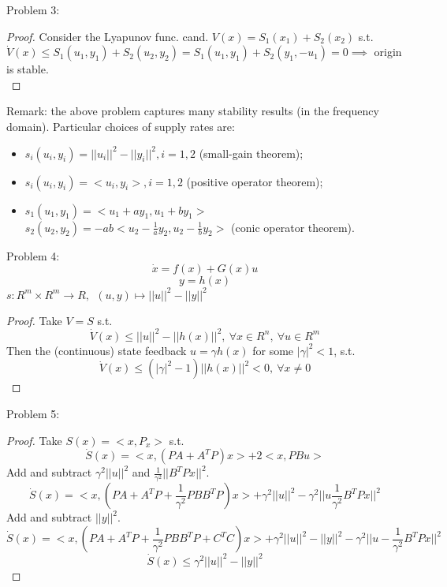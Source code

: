    Problem 3:
    \begin{proof}
        Consider the Lyapunov func. cand. $V(x) = S_1(x_1) + S_2(x_2)$ s.t. \\
        $\dot V (x) \le S_1(u_1,y_1) + S_2(u_2,y_2) = S_1(u_1,y_1) + S_2(y_1,-u_1) = 0 \implies$ origin is stable.\\
    \end{proof}
    
    Remark: the above problem captures many stability results (in the frequency domain). Particular choices of supply rates are:
    \begin{itemize}
        \item $s_i(u_i,y_i) = ||u_i||^2-||y_i||^2, i=1,2$ (small-gain theorem);
        \item $s_i(u_i,y_i) = <u_i,y_i>, i=1,2$ (positive operator theorem);
        \item $s_1(u_1,y_1) = <u_1+ay_1, u_1+by_1>$\\
        $s_2(u_2,y_2) = -ab<u_2-\frac{1}{a}y_2, u_2-\frac{1}{b}y_2>$ (conic operator theorem).
    \end{itemize}
    
    Problem 4:
    $$\dot x = f(x)+G(x)u$$
    $$y=h(x)$$
    $s: R^m \times R^m \rightarrow R, \ \ (u,y) \mapsto ||u||^2-||y||^2$
    \begin{proof}
        Take $V=S$ s.t.
        $$\dot V(x) \le ||u||^2-||h(x)||^2, \ \forall x \in R^n, \ \forall u \in R^m$$
        Then the (continuous) state feedback $u = \gamma h(x)$ for some $|\gamma|^2 < 1$, s.t.
        $$\dot V(x) \le (|\gamma|^2-1)||h(x)||^2 < 0, \ \forall x \neq 0$$
    \end{proof}
    
    Problem 5:
    \begin{proof}
        Take $S(x) = <x,P_x>$ s.t. 
        $$\dot S(x) = <x, (PA+A^TP)x>+2<x,PBu>$$
        Add and subtract $\gamma^2||u||^2$ and $\frac{1}{\gamma^2}||B^TPx||^2$.
        $$\dot S(x) = <x, (PA+A^TP+\frac{1}{\gamma^2}PBB^TP)x>+\gamma^2||u||^2-\gamma^2||u\frac{1}{\gamma^2}B^TPx||^2$$
        Add and subtract $||y||^2$.
        $$\dot S(x) = <x, (PA+A^TP+\frac{1}{\gamma^2}PBB^TP+C^TC)x>+\gamma^2||u||^2-||y||^2-\gamma^2||u-\frac{1}{\gamma^2}B^TPx||^2$$
        $$\dot S(x) \le \gamma^2||u||^2-||y||^2$$
    \end{proof}
    
